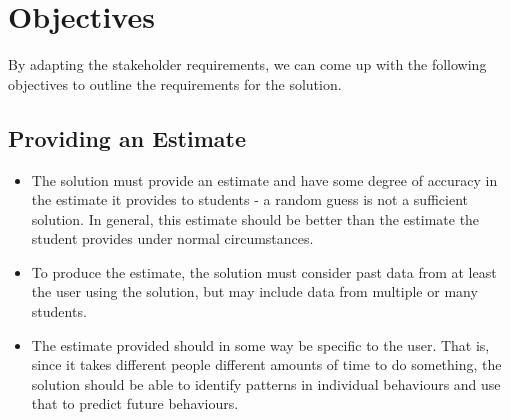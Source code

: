 \documentclass[11pt]{article}
\newenvironment{subs}
  {\adjustwidth{3em}{0pt}}
  {\endadjustwidth}
\begin{document}
\section{Objectives}
    By adapting the stakeholder requirements, we can come up with the following objectives to outline the requirements for the solution.
    \begin{subs}
        \subsection{Providing an Estimate}
        \begin{itemize}
            \item The solution must provide an estimate and have some degree of accuracy in the estimate it provides to students - a random guess is not a sufficient solution. In general, this estimate should be better than the estimate the student provides under normal circumstances.
            \item To produce the estimate, the solution must consider past data from at least the user using the solution, but may include data from multiple or many students.
            \item The estimate provided should in some way be specific to the user. That is, since it takes different people different amounts of time to do something, the solution should be able to identify patterns in individual behaviours and use that to predict future behaviours.
        \end{itemize}

\end{subs}
\end{document}
